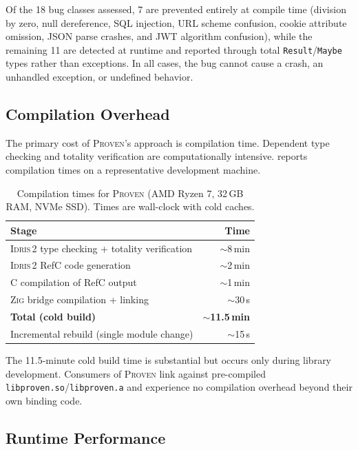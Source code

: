 \documentclass[11pt,a4paper]{article}
\newcommand{\proven}{\textsc{Proven}}
\newcommand{\idris}{\textsc{Idris\,2}}
\newcommand{\zig}{\textsc{Zig}}
\newcommand{\code}[1]{\texttt{#1}}
\begin{document}
Of the 18 bug classes assessed, 7 are prevented entirely at compile time
(division by zero, null dereference, SQL injection, URL scheme confusion,
cookie attribute omission, JSON parse crashes, and JWT algorithm
confusion), while the remaining 11 are detected at runtime and reported
through total \code{Result}/\code{Maybe} types rather than exceptions.
In all cases, the bug cannot cause a crash, an unhandled exception, or
undefined behavior.

\subsection{Compilation Overhead}

The primary cost of \proven{}'s approach is compilation time. Dependent
type checking and totality verification are computationally intensive.
 reports compilation times on a representative
development machine.

\begin{table}[t]
\centering
\caption{Compilation times for \proven{} (AMD Ryzen 7, 32\,GB RAM, NVMe
SSD). Times are wall-clock with cold caches.}
\label{tab:compile-times}
\begin{tabular}{@{}lr@{}}
\toprule
\textbf{Stage} & \textbf{Time} \\
\midrule
\idris{} type checking + totality verification & $\sim$8\,min \\
\idris{} RefC code generation & $\sim$2\,min \\
C compilation of RefC output & $\sim$1\,min \\
\zig{} bridge compilation + linking & $\sim$30\,s \\
\midrule
\textbf{Total (cold build)} & \textbf{$\sim$11.5\,min} \\
Incremental rebuild (single module change) & $\sim$15\,s \\
\bottomrule
\end{tabular}
\end{table}

The 11.5-minute cold build time is substantial but occurs only during
library development. Consumers of \proven{} link against pre-compiled
\code{libproven.so}/\code{libproven.a} and experience no compilation
overhead beyond their own binding code.

\subsection{Runtime Performance}
\end{document}
